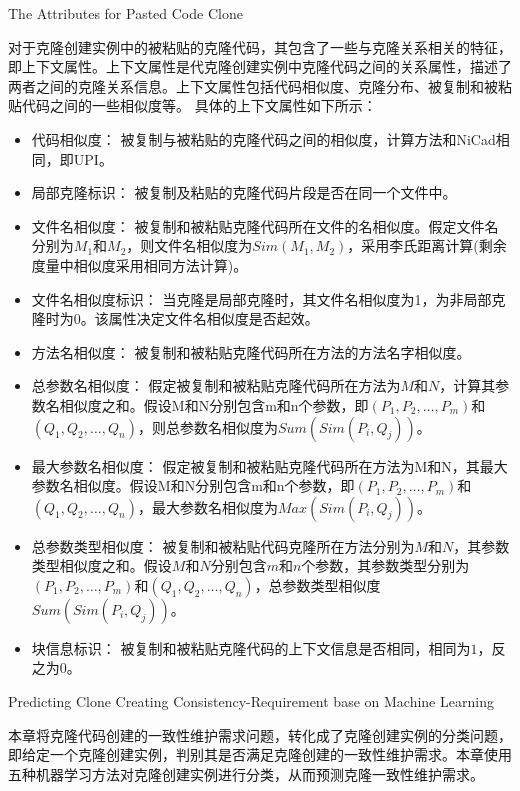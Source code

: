 {The Attributes for Pasted Code Clone}

对于克隆创建实例中的被粘贴的克隆代码，其包含了一些与克隆关系相关的特征，即上下文属性。上下文属性是代克隆创建实例中克隆代码之间的关系属性，描述了两者之间的克隆关系信息。上下文属性包括代码相似度、克隆分布、被复制和被粘贴代码之间的一些相似度等。
具体的上下文属性如下所示：

\begin{itemize}
\item
代码相似度：
被复制与被粘贴的克隆代码之间的相似度，计算方法和NiCad相同，即UPI\cite{roy2008nicad}。
\item
局部克隆标识：
被复制及粘贴的克隆代码片段是否在同一个文件中。
\item
文件名相似度：
被复制和被粘贴克隆代码所在文件的名相似度。假定文件名分别为$M_1$和$M_2$，则文件名相似度为$Sim(M_1,M_2)$，采用李氏距离\cite{levenshtein1966binary,navarro2001guided}计算(剩余度量中相似度采用相同方法计算)。
\item
文件名相似度标识：
当克隆是局部克隆时，其文件名相似度为1，为非局部克隆时为0。该属性决定文件名相似度是否起效。
\item
方法名相似度：
被复制和被粘贴克隆代码所在方法的方法名字相似度。
\item
总参数名相似度：
假定被复制和被粘贴克隆代码所在方法为$M$和$N$，计算其参数名相似度之和。假设M和N分别包含m和n个参数，即$(P_1,P_2,…,P_m)$和$(Q_1,Q_2,…,Q_n)$，则总参数名相似度为$Sum(Sim(P_i,Q_j))$。
\item
最大参数名相似度：
假定被复制和被粘贴克隆代码所在方法为M和N，其最大参数名相似度。假设M和N分别包含m和n个参数，即$(P_1,P_2,…,P_m)$和$(Q_1,Q_2,…,Q_n)$，最大参数名相似度为$Max(Sim(P_i,Q_j))$。
\item 
总参数类型相似度：
被复制和被粘贴代码克隆所在方法分别为$M$和$N$，其参数类型相似度之和。假设$M$和$N$分别包含$m$和$n$个参数，其参数类型分别为$(P_1,P_2,…,P_m)$和$(Q_1,Q_2,…,Q_n)$，总参数类型相似度$Sum(Sim(P_i,Q_j))$。
\item
块信息标识：
被复制和被粘贴克隆代码的上下文信息是否相同，相同为$1$，反之为$0$。
\end{itemize}

{Predicting Clone Creating Consistency-Requirement base on Machine Learning}
\label{lab-machine}

本章将克隆代码创建的一致性维护需求问题，转化成了克隆创建实例的分类问题，即给定一个克隆创建实例，判别其是否满足克隆创建的一致性维护需求。本章使用五种机器学习方法对克隆创建实例进行分类，从而预测克隆一致性维护需求。

